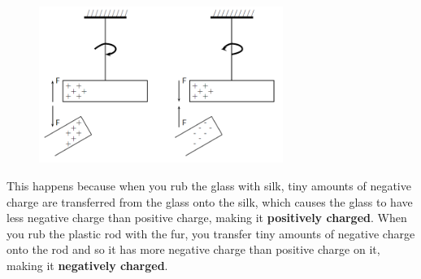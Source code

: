 	\begin{figure}[H] %
    \begin{center}
    \label{m38780*id200974!!!underscore!!!media}\label{m38780*id200974!!!underscore!!!printimage}\includegraphics[width=300px]{col11305.imgs/m38780_PG10C8_006.png} %
        
      \vspace{2pt}
    \vspace{.1in}
    
    \end{center}

 \end{figure}   

    \addtocounter{footnote}{-0}
    
      \par 
      \label{m38780*id200980}This happens because when you rub the glass with silk,
tiny amounts of negative charge are transferred from the glass
onto the silk, which causes the glass to have less negative charge
than positive charge, making it \textbf{positively charged}. When
you rub the plastic rod with the fur, you transfer tiny amounts of
negative charge onto the rod and so it has more negative charge
than positive charge on it, making it \textbf{negatively charged}.
 \par 

\label{m38780*secfhsst!!!underscore!!!id190}\vspace{.5cm} 
      
